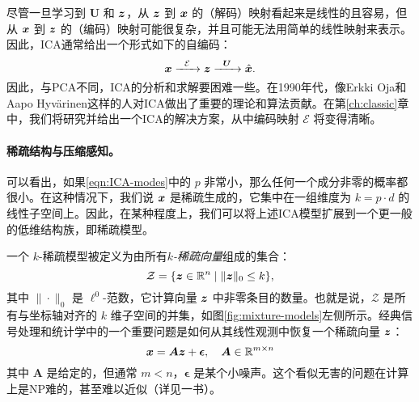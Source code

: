 \documentclass[../../book-main.tex]{subfiles}
\begin{document}
尽管一旦学习到 $\boldsymbol{U}$ 和 $\bm{z}$，从 $\bm{z}$ 到 $\bm{x}$ 的（解码）映射看起来是线性的且容易，但从 $\bm{x}$ 到 $\bm{z}$ 的（编码）映射可能很复杂，并且可能无法用简单的线性映射来表示。因此，ICA通常给出一个形式如下的自编码：
\begin{equation}
    \bm{x}   \xrightarrow{\hspace{2mm} \mathcal{E}\hspace{2mm}} \bm{z}  \xrightarrow{\hspace{2mm} \boldsymbol{U} \hspace{2mm}} \hat {\bm{x}}.
       \label{eqn:auto-encoding-ICA}
\end{equation}
因此，与PCA不同，ICA的分析和求解要困难一些。在1990年代，像Erkki Oja和Aapo Hyv\"{a}rinen\cite{hyvarinen-1997,Hyvrinen-2000}这样的人对ICA做出了重要的理论和算法贡献。在第\ref{ch:classic}章中，我们将研究并给出一个ICA的解决方案，从中编码映射 $\mathcal{E}$ 将变得清晰。



\paragraph{稀疏结构与压缩感知。}
可以看出，如果\eqref{eqn:ICA-modes}中的 $p$ 非常小，那么任何一个成分非零的概率都很小。在这种情况下，我们说 $\bm{x}$ 是稀疏生成的，它集中在一组维度为 $k = p \cdot d$ 的线性子空间上。因此，在某种程度上，我们可以将上述ICA模型扩展到一个更一般的低维结构族，即稀疏模型。

一个 $k$-稀疏模型被定义为由所有{\em $k$-稀疏向量}组成的集合：
\begin{equation}
    \mathcal{Z} = \{\bm{z} \in \mathbb{R}^n \mid \|\bm{z}\|_0 \le k\},
\end{equation}
其中 $\| \cdot \|_0$ 是 $\ell^0$-范数，它计算向量 $\bm{z}$ 中非零条目的数量。也就是说，$\mathcal{Z}$ 是所有与坐标轴对齐的 $k$ 维子空间的并集，如图\ref{fig:mixture-models}左侧所示。经典信号处理和统计学中的一个重要问题是如何从其线性观测中恢复一个稀疏向量 $\bm{z}$：
\begin{equation}
    \bm{x} = \boldsymbol{A} \bm{z} + \boldsymbol{\epsilon}, \quad \boldsymbol{A} \in \mathbb{R}^{m\times n}
    \label{eqn:sparse-model}
\end{equation}
其中 $\boldsymbol{A}$ 是给定的，但通常 $m < n$，$\boldsymbol{\epsilon}$ 是某个小噪声。这个看似无害的问题在计算上是NP难的，甚至难以近似（详见\cite{Wright-Ma-2022}一书）。
\end{document}
